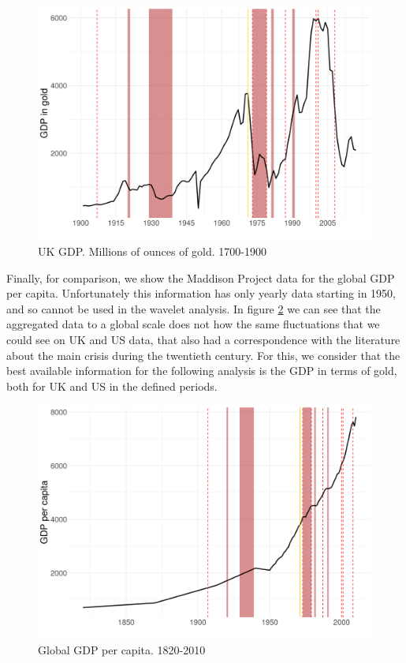 \documentclass[a4paper,10cpi]{article}
\begin{document}
	 \begin{figure}[H]
	 	\centering
	 	\includegraphics[width=0.75\linewidth]{gdp_uk_complement.png}
	 	\caption{UK GDP. Millions of ounces of gold. 1700-1900} 
	 	\label{fig:uk_gdp_complement}
	 \end{figure}
	 
	 	
	Finally, for comparison, we show the Maddison Project \citep{bolt2014} data for the global GDP per capita. Unfortunately this information has only yearly data starting in 1950, and so cannot be used in the wavelet analysis. In figure \ref{fig:global_gdp} we can see that the aggregated data to a global scale does not how the same fluctuations that we could see on UK and US data, that also had a correspondence with the literature about the main crisis during the twentieth century. For this, we consider that the best available information for the following analysis is the GDP in terms of gold, both for UK and US in the defined periods. 	

	 \begin{figure}[H]
		\centering
		\includegraphics[width=0.75\linewidth]{global_gdp.png}
		\caption{Global GDP per capita. 1820-2010} 
		\label{fig:global_gdp}
	\end{figure}
	
\end{document}
